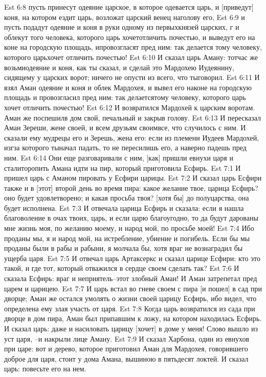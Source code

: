 Est 6:8  пусть принесут одеяние царское, в которое одевается царь, и [приведут] коня, на котором ездит царь, возложат царский венец наголову его,
Est 6:9  и пусть подадут одеяние и коня в руки одному из первыхкнязей царских, г и облекут того человека, которого царь хочетотличить почестью, и выведут его на коне на городскую площадь, ипровозгласят пред ним: так делается тому человеку, которого царьхочет отличить почестью!
Est 6:10  И сказал царь Аману: тотчас же возьмиодеяние и коня, как ты сказал, и сделай это Мардохею Иудеянину, сидящему у царских ворот; ничего не опусти из всего, что тыговорил.
Est 6:11  И взял Аман одеяние и коня и облек Мардохея, и вывел его наконе на городскую площадь и провозгласил пред ним: так делаетсятому человеку, которого царь хочет отличить почестью!
Est 6:12  И возвратился Мардохей к царским воротам. Аман же поспешилв дом свой, печальный и закрыв голову.
Est 6:13  И пересказал Аман Зереши, жене своей, и всем друзьям своимвсе, что случилось с ним. И сказали ему мудрецы его и Зерешь, жена его: если из племени Иудеев Мардохей, изгза которого тыначал падать, то не пересилишь его, а наверно падешь пред ним.
Est 6:14  Они еще разговаривали с ним, [как] пришли евнухи царя и сталиторопить Амана идти на пир, который приготовила Есфирь.
Est 7:1  И пришел царь с Аманом пировать у Есфири царицы.
Est 7:2  И сказал царь Есфири также и в [этот] второй день во время пира: какое желание твое, царица Есфирь? оно будет удовлетворено; и какая просьба твоя? [хотя бы] до полуцарства, она будет исполнена.
Est 7:3  И отвечала царица Есфирь и сказала: если я нашла благоволение в очах твоих, царь, и если царю благоугодно, то да будут дарованы мне жизнь моя, по желанию моему, и народ мой, по просьбе моей!
Est 7:4  Ибо проданы мы, я и народ мой, на истребление, убиение и погибель. Если бы мы проданы были в рабы и рабыни, я молчала бы, хотя враг не вознаградил бы ущерба царя.
Est 7:5  И отвечал царь Артаксеркс и сказал царице Есфири: кто это такой, и где тот, который отважился в сердце своем сделать так?
Est 7:6  И сказала Есфирь: враг и неприятель--этот злобный Аман! И Аман затрепетал пред царем и царицею.
Est 7:7  И царь встал во гневе своем с пира [и пошел] в сад при дворце; Аман же остался умолять о жизни своей царицу Есфирь, ибо видел, что определена ему злая участь от царя.
Est 7:8  Когда царь возвратился из сада при дворце в дом пира, Аман был припавшим к ложу, на котором находилась Есфирь. И сказал царь: даже и насиловать царицу [хочет] в доме у меня! Слово вышло из уст царя, --и накрыли лице Аману.
Est 7:9  И сказал Харбона, один из евнухов при царе: вот и дерево, которое приготовил Аман для Мардохея, говорившего доброе для царя, стоит у дома Амана, вышиною в пятьдесят локтей. И сказал царь: повесьте его на нем.
